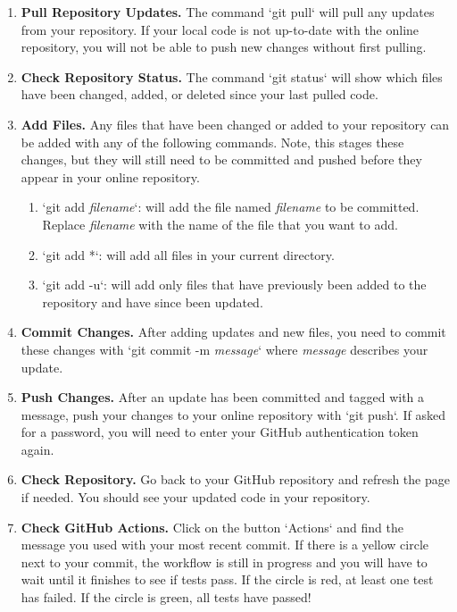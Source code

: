 \documentclass{article} %
\begin{document}
\begin{enumerate}
    \item \textbf{Pull Repository Updates.} The command `git pull` will pull any updates from your repository.  If your local code is not up-to-date with the online repository, you will not be able to push new changes without first pulling.

    \item \textbf{Check Repository Status.} The command `git status` will show which files have been changed, added, or deleted since your last pulled code.
    
    \item \textbf{Add Files.}  Any files that have been changed or added to your repository can be added with any of the following commands.  Note, this stages these changes, but they will still need to be committed and pushed before they appear in your online repository.
    \begin{enumerate}
        \item `git add \emph{filename}`: will add the file named \emph{filename} to be committed.  Replace \emph{filename} with the name of the file that you want to add.  
        \item `git add *`: will add all files in your current directory.
        \item `git add -u`: will add only files that have previously been added to the repository and have since been updated.
    \end{enumerate}

    \item \textbf{Commit Changes.}  After adding updates and new files, you need to commit these changes with `git commit -m \emph{message}` where \emph{message} describes your update.

    \item \textbf{Push Changes.}  After an update has been committed and tagged with a message, push your changes to your online repository with `git push`.  If asked for a password, you will need to enter your GitHub authentication token again.

    \item \textbf{Check Repository.}  Go back to your GitHub repository and refresh the page if needed.  You should see your updated code in your repository.

    \item \textbf{Check GitHub Actions.}  Click on the button `Actions` and find the message you used with your most recent commit.  If there is a yellow circle next to your commit, the workflow is still in progress and you will have to wait until it finishes to see if tests pass.  If the circle is red, at least one test has failed.  If the circle is green, all tests have passed!


\end{enumerate}
\end{document}
